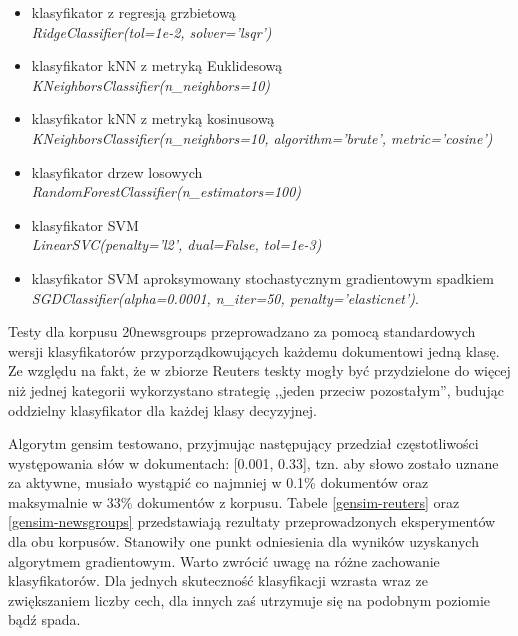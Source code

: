 \documentclass{pracamgr}
\begin{document}
\begin{itemize}
    \item klasyfikator z regresją grzbietową\\ \textit{RidgeClassifier(tol=1e-2, solver='lsqr')}
    \item klasyfikator kNN z metryką Euklidesową\\ \textit{KNeighborsClassifier(n\_neighbors=10)}
    \item klasyfikator kNN z metryką kosinusową\\
    \textit{KNeighborsClassifier(n\_neighbors=10, algorithm='brute', metric='cosine')}
    \item klasyfikator drzew losowych\\ \textit{RandomForestClassifier(n\_estimators=100)}
    \item klasyfikator SVM\\ \textit{LinearSVC(penalty='l2', dual=False, tol=1e-3)}
    \item klasyfikator SVM aproksymowany stochastycznym gradientowym spadkiem\\ \textit{SGDClassifier(alpha=0.0001, n\_iter=50, penalty='elasticnet')}.
\end{itemize}

Testy dla korpusu 20newsgroups przeprowadzano za pomocą standardowych wersji klasyfikatorów przyporządkowujących każdemu dokumentowi jedną klasę. Ze względu na fakt, że w zbiorze Reuters teskty mogły być przydzielone do więcej niż jednej kategorii wykorzystano strategię ,,jeden przeciw pozostałym'', budując oddzielny klasyfikator dla każdej klasy decyzyjnej.

Algorytm gensim testowano, przyjmując następujący przedział częstotliwości występowania słów w dokumentach: [0.001, 0.33], tzn. aby słowo zostało uznane za aktywne, musiało wystąpić co najmniej w 0.1\% dokumentów oraz maksymalnie w 33\% dokumentów z korpusu. Tabele \ref{gensim-reuters} oraz \ref{gensim-newsgroups} przedstawiają rezultaty przeprowadzonych eksperymentów dla obu korpusów. Stanowiły one punkt odniesienia dla wyników uzyskanych algorytmem gradientowym. Warto zwrócić uwagę na różne zachowanie klasyfikatorów. Dla jednych skuteczność klasyfikacji wzrasta wraz ze zwiększaniem liczby cech, dla innych zaś utrzymuje się na podobnym poziomie bądź spada.
\end{document}
